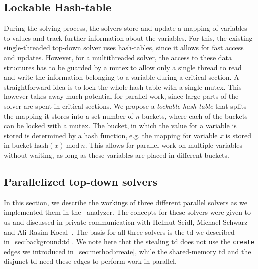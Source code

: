   \subsection{Lockable Hash-table}
  \label{sec:method:LHM}
  During the solving process, the solvers store and update a mapping of variables to values and track further information about the variables. For this, the existing single-threaded top-down solver uses hash-tables, since it allows for fast access and updates. However, for a multithreaded solver, the access to these data structures has to be guarded by a mutex to allow only a single thread to read and write the information belonging to a variable during a critical section. 
  A straightforward idea is to lock the whole hash-table with a single mutex. This however takes away much potential for parallel work, since large parts of the solver are spent in critical sections.
  We propose a \textit{lockable hash-table} that splits the mapping it stores into a set number of \textit{n} buckets, where each of the buckets can be locked with a mutex. The bucket, in which the value for a variable is stored is determined by a hash function, e.g. the mapping for variable \textit{x} is stored in bucket $\text{hash}(x)\ \text{mod}\ n$. This allows for parallel work on multiple variables without waiting, as long as these variables are placed in different buckets.

  \subsection{Parallelized top-down solvers}
  \label{sec:method:td_parallel}
  In this section, we describe the workings of three different parallel solvers as we implemented them in the \gob\ analyzer. The concepts for these solvers were given to us and discussed in private communication with Helmut Seidl, Michael Schwarz and Ali Rasim Kocal~\cite{privCom}. The basis for all three solvers is the \ac{td} we described in~\autoref{sec:background:td}. We note here that the stealing \ac{td} does not use the \texttt{create} edges we introduced in~\autoref{sec:method:create}, while the shared-memory \ac{td} and the disjunct \ac{td} need these edges to perform work in parallel.

